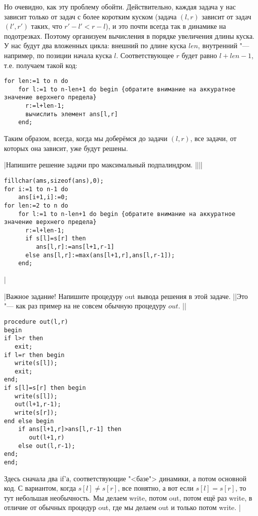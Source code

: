 Но очевидно, как эту проблему обойти. Действительно, каждая задача у нас зависит только от задач с более коротким куском (задача $(l,r)$ зависит от задач $(l',r')$ таких, что $r'-l'<r-l$), и это почти всегда так в динамике на подотрезках. Поэтому организуем вычисления в порядке увеличения длины куска. У нас будут два вложенных цикла: внешний по длине куска $len$, внутренний "--- например, по позиции начала куска $l$. Соответствующее $r$ будет равно $l+len-1$, т.е. получаем такой код:

\begin{codesampleo}\begin{verbatim}
for len:=1 to n do
    for l:=1 to n-len+1 do begin {обратите внимание на аккуратное значение верхнего предела}
      r:=l+len-1;
      вычислить элемент ans[l,r]
    end;
\end{verbatim}\end{codesampleo}

Таким образом, всегда, когда мы доберёмся до задачи $(l,r)$, все задачи, от которых она зависит, уже будут решены.

\task|Напишите решение задачи про максимальный подпалиндром.
||||
\begin{codesampleo}\begin{verbatim}
fillchar(ams,sizeof(ans),0);
for i:=1 to n-1 do
    ans[i+1,i]:=0;
for len:=2 to n do
    for l:=1 to n-len+1 do begin {обратите внимание на аккуратное значение верхнего предела}
      r:=l+len-1;
      if s[l]=s[r] then
         ans[l,r]:=ans[l+1,r-1]
      else ans[l,r]:=max(ans[l+1,r],ans[l,r-1]);
    end;
\end{verbatim}\end{codesampleo}
|

\task|Важное задание! Напишите процедуру out вывода решения в этой задаче.
||Это "--- как раз пример на не совсем обычную процедуру $out$.
||
\begin{codesample}\begin{verbatim}
procedure out(l,r)
begin
if l>r then
   exit;
if l=r then begin
   write(s[l]);
   exit;
end;
if s[l]=s[r] then begin
   write(s[l]);
   out(l+1,r-1);
   write(s[r]);
end else begin
    if ans[l+1,r]>ans[l,r-1] then
       out(l+1,r)
    else out(l,r-1);
end;
end;
\end{verbatim}\end{codesample}
Здесь сначала два if'а, соответствующие "<базе"> динамики, а потом основной код. С вариантом, когда 
$s[l]\neq s[r]$, все понятно, а вот если $s[l]=s[r]$, то тут небольшая необычность. Мы делаем 
write, потом out, потом ещё раз write, в отличие от обычных процедур out, где мы делаем out и 
только потом write.
|

